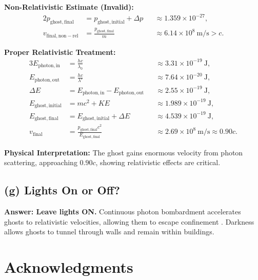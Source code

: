 \documentclass[10pt,a4paper]{article}
\begin{document}
\noindent \textbf{Non-Relativistic Estimate (Invalid):}
\begin{alignat}{2}
p_\mathrm{ghost,final} &= p_\mathrm{ghost,initial} + \Delta p &&\approx 1.359 \times 10^{-27}, \\
v_\mathrm{final,non-rel} &= \frac{p_\mathrm{ghost,final}}{m} &&\approx 6.14 \times 10^8~\mathrm{m/s} > c.
\end{alignat}

\noindent \textbf{Proper Relativistic Treatment:}
\begin{alignat}{3}
E_\mathrm{photon,in} &= \frac{hc}{\lambda_0} &&\approx 3.31 \times 10^{-19}~\mathrm{J}, \\
E_\mathrm{photon,out} &= \frac{hc}{\lambda'} &&\approx 7.64 \times 10^{-20}~\mathrm{J}, \\
\Delta E &= E_\mathrm{photon,in} - E_\mathrm{photon,out} &&\approx 2.55 \times 10^{-19}~\mathrm{J}, \\
E_\mathrm{ghost,initial} &= m c^2 + KE &&\approx 1.989 \times 10^{-19}~\mathrm{J}, \\
E_\mathrm{ghost,final} &= E_\mathrm{ghost,initial} + \Delta E &&\approx 4.539 \times 10^{-19}~\mathrm{J}, \\
v_\mathrm{final} &= \frac{p_\mathrm{ghost,final} c^2}{E_\mathrm{ghost,final}} &&\approx 2.69 \times 10^8~\mathrm{m/s} \approx 0.90 c.
\end{alignat}

\noindent \textbf{Physical Interpretation:}  
The ghost gains enormous velocity from photon scattering, approaching $0.90c$,\cite{LongairHEA} showing relativistic effects are critical.

\vspace{2mm}
\subsection*{(g) Lights On or Off?}

\textbf{Answer: Leave lights ON.} Continuous photon bombardment accelerates ghosts to relativistic velocities, allowing them to escape confinement \cite{HallidayResnick}. Darkness allows ghosts to tunnel through walls and remain within buildings.
\section*{Acknowledgments}
\end{document}
